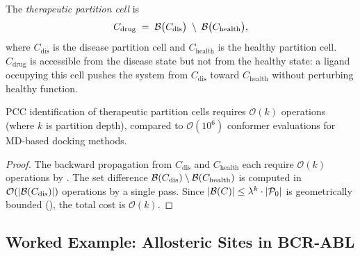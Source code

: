 \begin{definition}
\label{def:ch05-therapeutic-cell}
The \emph{therapeutic partition cell} is
\begin{equation}
\label{eq:ch05-therapeutic}
    C_{\mathrm{drug}} \;=\;
    \mathcal{B}\bigl(C_{\mathrm{dis}}\bigr) \;\setminus\;
    \mathcal{B}\bigl(C_{\mathrm{health}}\bigr),
\end{equation}
where $C_{\mathrm{dis}}$ is the disease partition cell and
$C_{\mathrm{health}}$ is the healthy partition cell.  $C_{\mathrm{drug}}$
is accessible from the disease state but not from the healthy state: a
ligand occupying this cell pushes the system from $C_{\mathrm{dis}}$
toward $C_{\mathrm{health}}$ without perturbing healthy function.
\end{definition}

\begin{theorem}
\label{thm:ch05-drug-complexity}
PCC identification of therapeutic partition cells requires
$\mathcal{O}(k)$ operations (where $k$ is partition depth), compared
to $\mathcal{O}(10^6)$ conformer evaluations for MD-based docking
methods.
\end{theorem}

\begin{proof}
The backward propagation from $C_{\mathrm{dis}}$ and $C_{\mathrm{health}}$
each require $\mathcal{O}(k)$ operations by .
The set difference $\mathcal{B}(C_{\mathrm{dis}}) \setminus \mathcal{B}(C_{\mathrm{health}})$
is computed in $\mathcal{O}(|\mathcal{B}(C_{\mathrm{dis}})|)$ operations by
a single pass.  Since $|\mathcal{B}(C)| \leq \lambda^k \cdot |\mathcal{P}_0|$
is geometrically bounded (), the total cost
is $\mathcal{O}(k)$.
\end{proof}

\subsection{Worked Example: Allosteric Sites in BCR-ABL}

